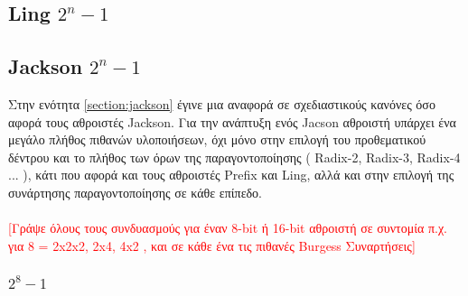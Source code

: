 \subsection{Ling $2^n-1$}









\subsection{Jackson $2^n-1$}
Στην ενότητα \ref{section:jackson} έγινε μια αναφορά σε σχεδιαστικούς κανόνες όσο αφορά τους 
αθροιστές Jackson. Για την ανάπτυξη ενός Jacson αθροιστή υπάρχει ένα μεγάλο πλήθος πιθανών υλοποιήσεων,
όχι μόνο στην επιλογή του προθεματικού δέντρου και το πλήθος των όρων της παραγοντοποίησης ( Radix-2, 
Radix-3, Radix-4 ... ), κάτι που αφορά και τους αθροιστές Prefix και Ling, αλλά 
και στην επιλογή της συνάρτησης παραγοντοποίησης σε κάθε επίπεδο.
\\\\
\textcolor{red}{[Γράψε όλους τους συνδυασμούς για έναν 8-bit ή 16-bit αθροιστή σε συντομία
π.χ. για 8 = 2x2x2, 2x4, 4x2 , και σε κάθε ένα τις πιθανές Burgess Συναρτήσεις]}






\subsubsection{$2^8-1$}

